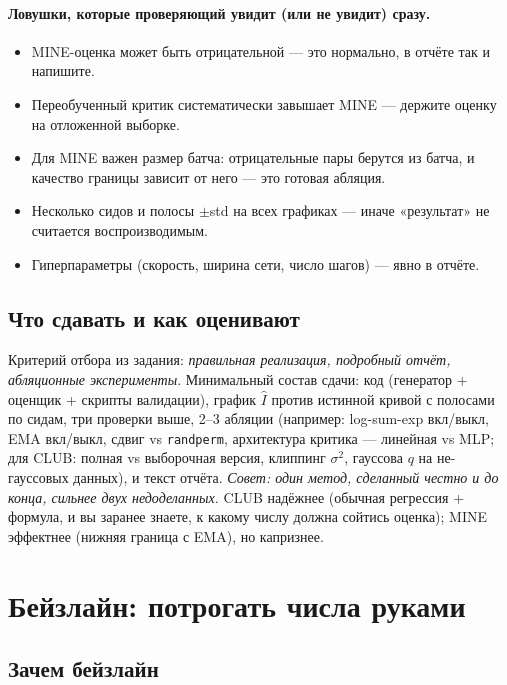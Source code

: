 \documentclass[11pt]{article}
\begin{document}
\paragraph{Ловушки, которые проверяющий увидит (или не увидит) сразу.}

\begin{itemize}
\item MINE-оценка может быть отрицательной — это нормально, в отчёте так и напишите.
\item Переобученный критик систематически завышает MINE — держите оценку на отложенной выборке.
\item Для MINE важен размер батча: отрицательные пары берутся из батча, и качество границы зависит от него — это готовая абляция.
\item Несколько сидов и полосы $\pm$std на всех графиках — иначе «результат» не считается воспроизводимым.
\item Гиперпараметры (скорость, ширина сети, число шагов) — явно в отчёте.
\end{itemize}

\subsection{Что сдавать и как оценивают}

Критерий отбора из задания: \emph{правильная реализация, подробный отчёт, абляционные эксперименты}. Минимальный состав сдачи: код (генератор + оценщик + скрипты валидации), график $\hat I$ против истинной кривой с полосами по сидам, три проверки выше, 2--3 абляции (например: log-sum-exp вкл/выкл, EMA вкл/выкл, сдвиг vs \texttt{randperm}, архитектура критика — линейная vs MLP; для CLUB: полная vs выборочная версия, клиппинг $\sigma^2$, гауссова $q$ на не-гауссовых данных), и текст отчёта. \emph{Совет: один метод, сделанный честно и до конца, сильнее двух недоделанных.} CLUB надёжнее (обычная регрессия + формула, и вы заранее знаете, к какому числу должна сойтись оценка); MINE эффектнее (нижняя граница с EMA), но капризнее.

\section{Бейзлайн: потрогать числа руками}

\subsection{Зачем бейзлайн}
\end{document}
